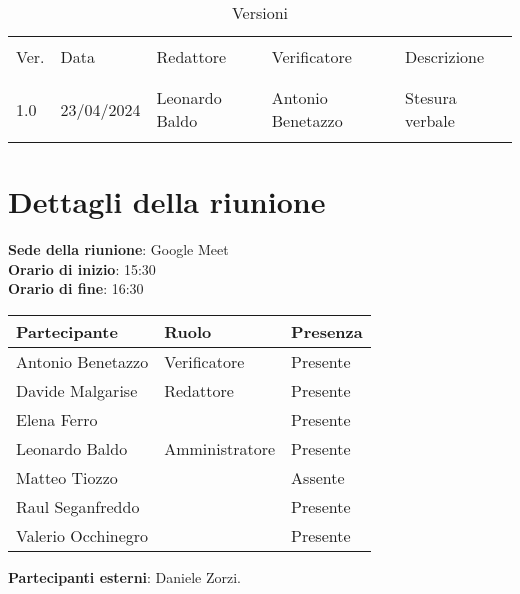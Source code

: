 \documentclass[italian,12pt]{article}
\begin{document}


\newpage



\begin{table}[!h]
	\caption{Versioni}
	\footnotesize
	\begin{center}
		\begin{tabular}{ l l l l l }
			\hline \\[-2ex]
			Ver. & Data       & Redattore          & Verificatore       & Descrizione  \\
			\\[-2ex] \hline \\[-1.5ex]
			1.0  & 23/04/2024 & Leonardo Baldo  & Antonio Benetazzo & Stesura verbale \\
			\\[-1.5ex] \hline
		\end{tabular}
	\end{center}
\end{table}

\newpage

\tableofcontents

\newpage

\section{Dettagli della riunione}


\textbf{Sede della riunione}: Google Meet\\
\textbf{Orario di inizio}: 15:30\\
\textbf{Orario di fine}: 16:30\\


\begin{flushleft}
	\begin{table}[!h]
	\begin{tabular}{ |l|l|l| } 
		\hline
		\textbf{Partecipante} & \textbf{Ruolo}       & \textbf{Presenza} \\
		\hline 
		Antonio Benetazzo     & Verificatore         & Presente          \\
		Davide Malgarise      & Redattore            & Presente          \\
		Elena Ferro           &                      & Presente          \\
		Leonardo Baldo        & Amministratore       & Presente          \\
		Matteo Tiozzo         &                      & Assente           \\
		Raul Seganfreddo      &                      & Presente          \\
		Valerio Occhinegro    &                      & Presente          \\
		\hline
	\end{tabular}
	\end{table}
	\textbf{Partecipanti esterni}: Daniele Zorzi.
\end{flushleft}
\end{document}

